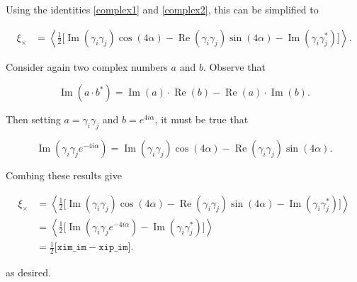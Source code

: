 \documentclass[%
 reprint,
 amsmath,amssymb,
 aps,nofootinbib
]{revtex4-1}
\begin{document}
Using the identities \eqref{complex1} and \eqref{complex2}, this can be simplified to

\begin{align*}
\xi_\times&=\left<\frac{1}{2}\big[\operatorname{Im}(\gamma_i\gamma_j)\cos(4\alpha)-\operatorname{Re}(\gamma_i\gamma_j)\sin(4\alpha)-\operatorname{Im}(\gamma_i\gamma_j^*)\big]\right>.
\end{align*}

Consider again two complex numbers $a$ and $b$. Observe that

\begin{equation}
\operatorname{Im}(a\cdot b^*)=\operatorname{Im}(a)\cdot\operatorname{Re}(b)-\operatorname{Re}(a)\cdot\operatorname{Im}(b).
\end{equation}

Then setting $a=\gamma_i\gamma_j$ and $b=e^{4i\alpha}$, it must be true that

$$\operatorname{Im}\left(\gamma_i\gamma_je^{-4i\alpha}\right)=\operatorname{Im}(\gamma_i\gamma_j)\cos(4\alpha)-\operatorname{Re}(\gamma_i\gamma_j)\sin(4\alpha).$$

Combing these results give

\begin{align}
\xi_\times&=\left<\frac{1}{2}\big[\operatorname{Im}(\gamma_i\gamma_j)\cos(4\alpha)-\operatorname{Re}(\gamma_i\gamma_j)\sin(4\alpha)-\operatorname{Im}(\gamma_i\gamma_j^*)\big]\right>\nonumber \\
&=\left<\frac{1}{2}\big[\operatorname{Im}\left(\gamma_i\gamma_je^{-4i\alpha}\right)-\operatorname{Im}(\gamma_i\gamma_j^*)\big]\right>\nonumber \\
&=\frac{1}{2}\big[\texttt{xim\_im}-\texttt{xip\_im}\big].
\end{align}

as desired.
\end{document}
